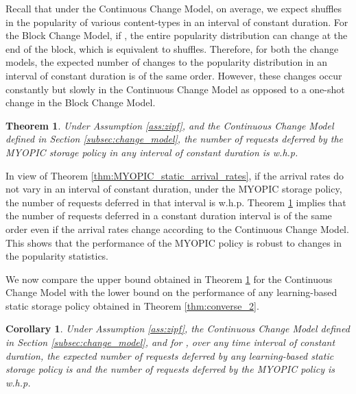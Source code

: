 \documentclass[10pt, conference, letterpaper]{IEEEtran}
\newtheorem{corollary}{Corollary}
\newtheorem{theorem}{Theorem}
\begin{document}
Recall that under the Continuous Change Model, on average, we expect
 shuffles in the popularity of various content-types in an
interval of constant duration. For the Block Change Model, if , the entire popularity distribution can change at the end
of the block, which is equivalent to  shuffles. Therefore, for both
the change models, the expected number of changes to the popularity
distribution in an interval of constant duration is of the same
order. However, these changes occur constantly but slowly in the
Continuous Change Model as opposed to a one-shot change in the Block
Change Model.

\begin{theorem}
	\label{thm:MYOPIC_changing_arrival_rates}
	Under Assumption \ref{ass:zipf}, and the Continuous Change Model
	defined in Section \ref{subsec:change_model}, the number of requests
	deferred by the MYOPIC storage policy in any interval of constant
	duration is  w.h.p.
\end{theorem}

In view of Theorem \ref{thm:MYOPIC_static_arrival_rates}, if the
arrival rates do not vary in an interval of constant duration, under
the MYOPIC storage policy, the number of requests deferred in that
interval is  w.h.p. Theorem
\ref{thm:MYOPIC_changing_arrival_rates} implies that the number
of requests deferred in a constant duration interval is of the same
order even if the arrival rates change according to the Continuous
Change Model. This shows that the performance of the MYOPIC policy is
robust to changes in the popularity statistics.



We now compare the upper bound obtained in Theorem \ref{thm:MYOPIC_changing_arrival_rates} for the Continuous Change Model with the lower bound on the performance of any learning-based static storage policy obtained in Theorem \ref{thm:converse_2}.

\begin{corollary}
	\label{cor:MYOPIC_changing_arrival_rates}
	Under Assumption \ref{ass:zipf}, the Continuous Change Model defined in
	Section \ref{subsec:change_model}, and for , over any time
	interval of constant duration, the expected number of requests deferred by
	any learning-based static storage policy is  and the number of requests deferred by the MYOPIC policy is 
	w.h.p.
\end{corollary}
\end{document}

